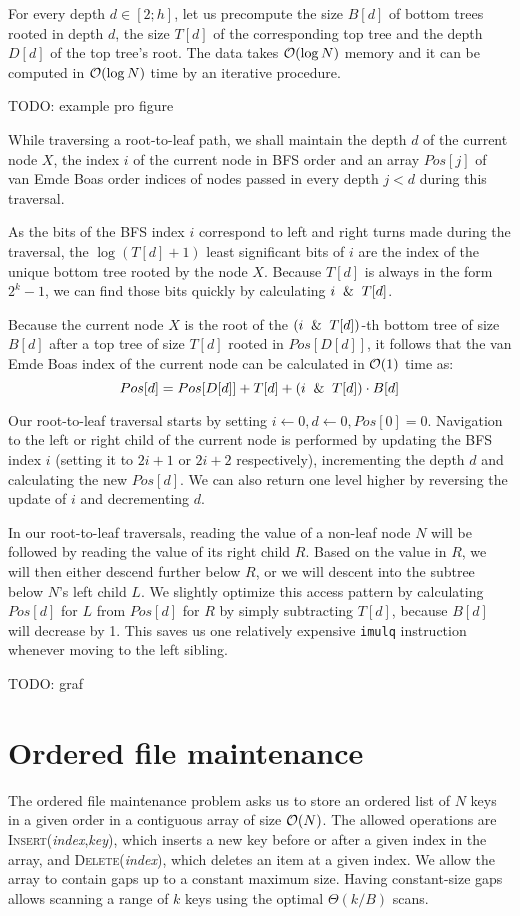 For every depth $d\in[2;h]$, let us precompute the size $B[d]$ of
bottom trees rooted in depth $d$, the size $T[d]$ of the corresponding
top tree and the depth $D[d]$ of the top tree's root. The data takes $\mathcal{O}(\log
N)$ memory and it can be computed in $\mathcal{O}(\log N)$ time by an iterative procedure.

TODO: example pro figure

While traversing a root-to-leaf path, we shall maintain the depth
$d$ of the current node $X$, the index $i$ of the current node in BFS order
and an array $Pos[j]$ of van Emde Boas order indices of nodes passed in every
depth $j<d$ during this traversal.

As the bits of the BFS index $i$ correspond to left and right turns made during
the traversal, the $\log(T[d]+1)$ least significant bits of $i$ are the
index of the unique bottom tree rooted by the node $X$. Because $T[d]$ is
always in the form $2^k-1$, we can find those bits quickly by calculating
$i \And T[d]$.

Because the current node $X$ is the root of the $(i \And T[d])$-th
bottom tree of size $B[d]$ after a top tree of size $T[d]$ rooted in
$Pos[D[d]]$, it follows that the van Emde Boas index of the current node can be
calculated in $\mathcal{O}(1)$ time as:
$$Pos[d]=Pos[D[d]] + T[d] + (i \And T[d]) \cdot B[d]$$

Our root-to-leaf traversal starts by setting $i\gets 0, d\gets 0, Pos[0]=0$.
Navigation to the left or right child of the current node is performed
by updating the BFS index $i$ (setting it to $2i+1$ or $2i+2$ respectively),
incrementing the depth $d$ and calculating the new $Pos[d]$.
We can also return one level higher by reversing the update of $i$ and
decrementing $d$.

In our root-to-leaf traversals, reading the value of a non-leaf node $N$ will be
followed by reading the value of its right child $R$. Based on the value in
$R$, we will then either descend further below $R$, or we will descent into
the subtree below $N$'s left child $L$.
We slightly optimize this access pattern by calculating $Pos[d]$ for $L$
from $Pos[d]$ for $R$ by simply subtracting $T[d]$, because $B[d]$ will
decrease by 1. This saves us one relatively expensive \texttt{imulq}
instruction whenever moving to the left sibling.

TODO: graf

\section{Ordered file maintenance}
The ordered file maintenance problem asks us to store an ordered list of
$N$ keys in a given order in a contiguous array of size $\mathcal{O}(N)$.
The allowed operations are \textsc{Insert}(\textit{index},\textit{key}),
which inserts a new key before or after a given index in the array,
and \textsc{Delete}(\textit{index}), which deletes an item at a given index.
We allow the array to contain gaps up to a constant maximum size.
Having constant-size gaps allows scanning a range of $k$ keys using the
optimal $\Theta(k/B)$ scans.

